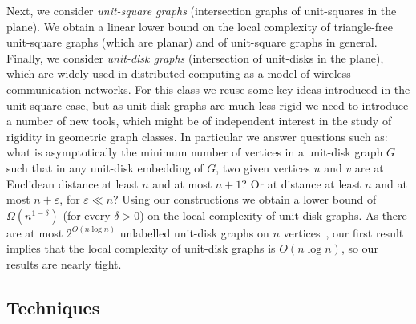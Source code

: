 \documentclass[a4paper,reqno, 12pt]{amsart}
\begin{document}
\medskip

Next, we consider \emph{unit-square graphs} (intersection
graphs of
unit-squares in the plane). We obtain a linear lower bound on
the local complexity of triangle-free
unit-square graphs (which are planar) and of unit-square graphs in
general. 
Finally, we consider \emph{unit-disk  graphs} (intersection of unit-disks in
the plane), which are widely used in distributed computing as a model
of wireless communication networks. For this class we reuse some key
ideas introduced in the unit-square case, but as unit-disk graphs are
much less rigid we need to introduce a number of new tools, which
might be of independent interest in the study of rigidity in
geometric graph classes. In particular we answer questions such as: what is
asymptotically the
minimum number of vertices in a unit-disk graph $G$ such that in any
unit-disk embedding of $G$, two given vertices $u$ and $v$ are at
Euclidean distance at least $n$ and at most $n+1$? Or at distance at
least $n$ and at most $n+\varepsilon$, for $\varepsilon\ll n$? Using our
constructions we obtain a lower bound of 
$\Omega(n^{1-\delta})$ (for every $\delta>0$) on the local complexity
of unit-disk graphs. As there are at most $2^{O(n\log n)}$ unlabelled
unit-disk graphs on $n$ vertices~\cite{MCDIARMID2014413}, our first result implies that the
local complexity of unit-disk graphs is $O(n \log n)$, so our results
are nearly tight.

\subsection*{Techniques} 
\end{document}
